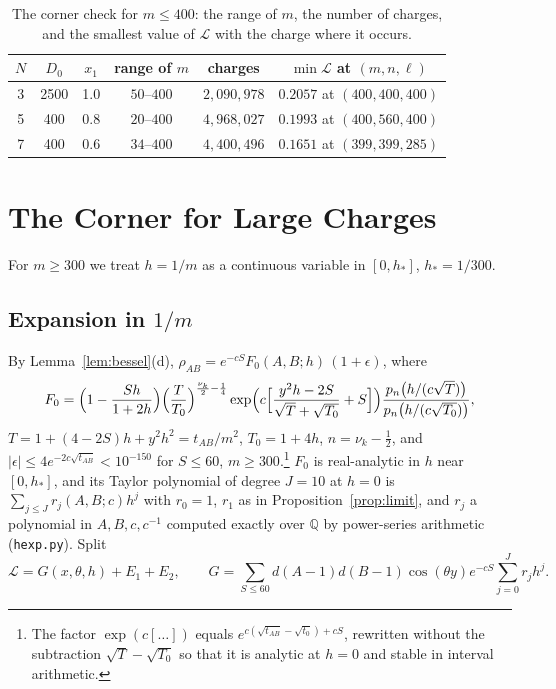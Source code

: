 \documentclass[11pt]{amsart}
\numberwithin{equation}{section}
\theoremstyle{plain}
\theoremstyle{definition}
\theoremstyle{remark}
\newcommand{\Q}{\mathbb{Q}}
\newcommand{\cL}{\mathcal{L}}
\newcommand{\CNthree}{$2{,}090{,}978$}\newcommand{\CNfive}{$4{,}968{,}027$}\newcommand{\CNseven}{$4{,}400{,}496$}\newcommand{\CMthree}{$0.2057$ at $(400,400,400)$}\newcommand{\CMfive}{$0.1993$ at $(400,560,400)$}\newcommand{\CMseven}{$0.1651$ at $(399,399,285)$}
\begin{document}
\begin{table}[t]
\centering
\caption{The corner check for $m\le400$: the range of $m$, the number of charges, and the smallest value of $\cL$ with the charge where it occurs.}
\label{tab:corner}
\begin{tabular}{cccccc}
\toprule
$N$&$D_0$&$x_1$&range of $m$&charges&$\min\cL$ at $(m,n,\ell)$\\
\midrule
3&2500&1.0&$50$--$400$&\CNthree&\CMthree\\
5&400&0.8&$20$--$400$&\CNfive&\CMfive\\
7&400&0.6&$34$--$400$&\CNseven&\CMseven\\
\bottomrule
\end{tabular}
\end{table}

\section{The Corner for Large Charges}\label{sec:large}

For $m\ge300$ we treat $h=1/m$ as a continuous variable in $[0,h_*]$, $h_*=1/300$.

\subsection{Expansion in $1/m$}
By Lemma~\ref{lem:bessel}(d), $\rho_{AB}=e^{-cS}F_0(A,B;h)\,(1+\epsilon)$, where
\[
F_0=\Bigl(1-\frac{Sh}{1+2h}\Bigr)\Bigl(\frac{T}{T_0}\Bigr)^{\frac{\nu_k}2-\frac14}\exp\Bigl(c\Bigl[\frac{y^2h-2S}{\sqrt T+\sqrt{T_0}}+S\Bigr]\Bigr)\frac{p_n\bigl(h/(c\sqrt T)\bigr)}{p_n\bigl(h/(c\sqrt{T_0})\bigr)},
\]
$T=1+(4-2S)h+y^2h^2=t_{AB}/m^2$, $T_0=1+4h$, $n=\nu_k-\frac12$, and $|\epsilon|\le4e^{-2c\sqrt{t_{AB}}}<10^{-150}$ for $S\le60$, $m\ge300$.\footnote{The factor $\exp(c[\dots])$ equals $e^{c(\sqrt{t_{AB}}-\sqrt{t_0})+cS}$, rewritten without the subtraction $\sqrt T-\sqrt{T_0}$ so that it is analytic at $h=0$ and stable in interval arithmetic.} $F_0$ is real-analytic in $h$ near $[0,h_*]$, and its Taylor polynomial of degree $J=10$ at $h=0$ is $\sum_{j\le J}r_j(A,B;c)h^j$ with $r_0=1$, $r_1$ as in Proposition~\ref{prop:limit}, and $r_j$ a polynomial in $A,B,c,c^{-1}$ computed exactly over $\Q$ by power-series arithmetic (\texttt{hexp.py}). Split
\[
\cL=G(x,\theta,h)+E_1+E_2,\qquad G=\sum_{S\le60}d(A-1)d(B-1)\cos(\theta y)e^{-cS}\sum_{j=0}^Jr_jh^j .
\]
\end{document}
